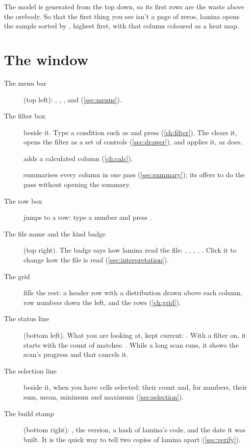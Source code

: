 The model is generated from the top down, so its first rows are the waste above the orebody. So that the
first thing you see isn't a page of zeros, lamina opens the sample sorted by , highest
first, with that column coloured as a heat map.


\section{The window}\label{sec:window}

\begin{description}
\item[The menu bar] (top left): , , ,  and 
(\cref{sec:menus}).
\item[The filter box] beside it. Type a condition such as 
and press  (\cref{ch:filter}). The  clears it,  opens the filter as a set of
controls (\cref{sec:drawer}), and  applies it, as  does.
\item[] adds a calculated column (\cref{ch:calc}).
\item[] summarises every column in one pass (\cref{sec:summary}); its  offers to do the
pass without opening the summary.
\item[The row box] jumps to a row: type a number and press .
\item[The file name and the kind badge] (top right). The badge says how lamina read the file:
, , , , . Click it to change how the file is
read (\cref{sec:interpretation}).
\item[The grid] fills the rest: a header row with a distribution drawn above each column, row numbers
down the left, and the rows (\cref{ch:grid}).
\item[The status line] (bottom left). What you are looking at, kept current:
. With a filter on, it starts
with the count of matches: . While a long scan runs, it shows the
scan's progress and that  cancels it.
\item[The selection line] beside it, when you have cells selected: their count and, for numbers, their
sum, mean, minimum and maximum (\cref{sec:selection}).
\item[The build stamp] (bottom right): , the version, a hash of
lamina's code, and the date it was built. It is the quick way to tell two copies of lamina apart
(\cref{sec:verify}).
\end{description}

